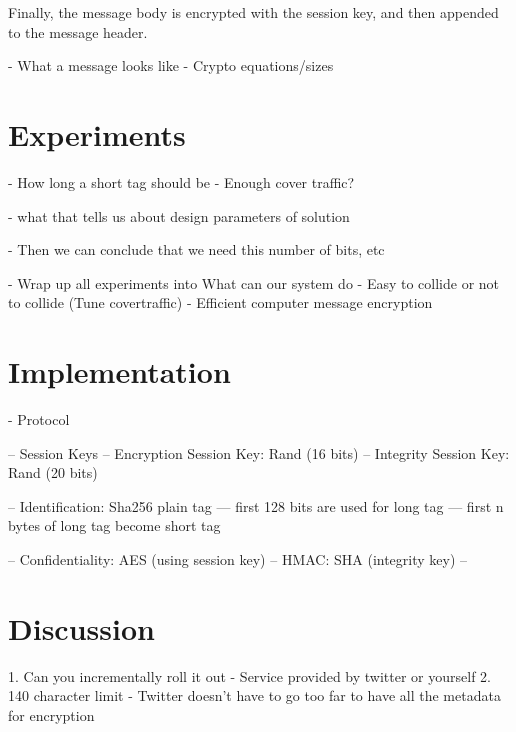 \documentclass{acm_proc_article-sp}
\begin{document}
Finally, the message body is encrypted with the session key, and then appended to the message header.

	





- What a message looks like
- Crypto equations/sizes

\section{Experiments}

- How long a short tag should be
- Enough cover traffic?

- what that tells us about design parameters of solution

- Then we can conclude that we need this number of bits, etc

- Wrap up all experiments into What can our system do
	- Easy to collide or not to collide (Tune covertraffic)
	- Efficient computer message encryption



\section{Implementation}

- Protocol

-- Session Keys
-- Encryption Session Key: Rand (16 bits)
-- Integrity Session Key: Rand (20 bits)

-- Identification: Sha256 plain tag
--- first 128 bits are used for long tag
--- first n bytes of long tag become short tag

-- Confidentiality: AES (using session key)
-- HMAC: SHA (integrity key)
-- 

\section{Discussion}
1. Can you incrementally roll it out
	- Service provided by twitter or yourself
2. 140 character limit
	- Twitter doesn't have to go too far to have all the metadata for encryption
\end{document}
